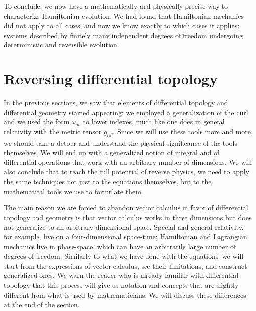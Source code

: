 To conclude, we now have a mathematically and physically precise way to characterize Hamiltonian evolution. We had found that Hamiltonian mechanics did not apply to all cases, and now we know exactly to which cases it applies: systems described by finitely many independent degrees of freedom undergoing deterministic and reversible evolution.

\section{Reversing differential topology}

In the previous sections, we saw that elements of differential topology and differential geometry started appearing: we employed a generalization of the curl and we used the form $\omega_{ab}$ to lower indexes, much like one does in general relativity with the metric tensor $g_{\alpha\beta}$. Since we will use these tools more and more, we should take a detour and understand the physical significance of the tools themselves. We will end up with a generalized notion of integral and of differential operations that work with an arbitrary number of dimensions. We will also conclude that to reach the full potential of reverse physics, we need to apply the same techniques not just to the equations themselves, but to the mathematical tools we use to formulate them.


The main reason we are forced to abandon vector calculus in favor of differential topology and geometry is that vector calculus works in three dimensions but does not generalize to an arbitrary dimensional space. Special and general relativity, for example, live on a four-dimensional space-time; Hamiltonian and Lagrangian mechanics live in phase-space, which can have an arbitrarily large number of degrees of freedom. Similarly to what we have done with the equations, we will start from the expressions of vector calculus, see their limitations, and construct generalized ones. We warn the reader who is already familiar with differential topology that this process will give us notation and concepts that are slightly different from what is used by mathematicians. We will discuss these differences at the end of the section.

